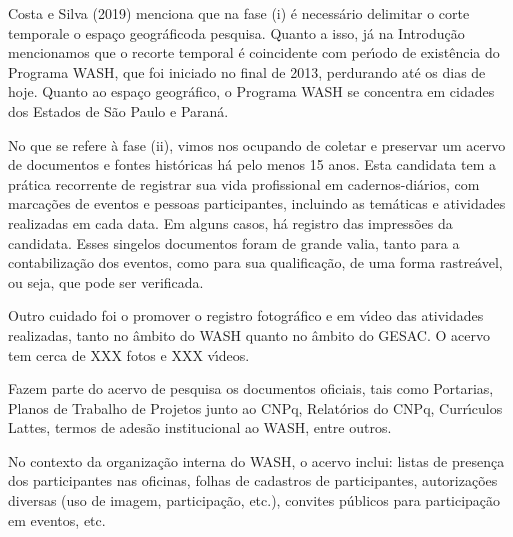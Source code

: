 \documentclass[
12pt,		%
openright,	%
twoside,  %
a4paper,			%
chapter=TITLE,		%
english,			%
french,				%
spanish,			%
brazil				%
]{USPSC-classe/USPSC}
\begin{document}
Costa e Silva (2019) menciona que na fase (i) \'e necess\'ario delimitar o \textquotedbl corte temporal\textquotedbl  e o \textquotedbl espa\c{c}o geogr\'afico\textquotedbl  da pesquisa.  Quanto a isso, j\'a na Introdu\c{c}\~ao mencionamos que o recorte temporal \'e coincidente com per\'{\i}odo de exist\^encia do Programa WASH, que foi iniciado no final de 2013, perdurando at\'e os dias de hoje. Quanto ao espa\c{c}o geogr\'afico, o Programa WASH se concentra em cidades dos Estados de S\~ao Paulo e Paran\'a.









No que se refere \`a fase (ii), vimos nos ocupando de coletar e preservar um acervo de documentos e fontes hist\'oricas h\'a pelo menos 15 anos. Esta candidata tem a pr\'atica recorrente de registrar sua vida profissional em cadernos-di\'arios, com marca\c{c}\~oes de eventos e pessoas participantes, incluindo as tem\'aticas e atividades realizadas em cada data. Em alguns casos, h\'a registro das impress\~oes da candidata. Esses singelos documentos foram de grande valia, tanto para a contabiliza\c{c}\~ao dos eventos, como para sua qualifica\c{c}\~ao, de uma forma rastre\'avel, ou seja, que pode ser verificada.









Outro cuidado foi o promover o registro fotogr\'afico e em v\'{\i}deo das atividades realizadas, tanto no \^ambito do WASH quanto no \^ambito do GESAC. O acervo tem cerca de XXX fotos e XXX v\'{\i}deos.









Fazem parte do acervo de pesquisa os documentos oficiais, tais como Portarias, Planos de Trabalho de Projetos junto ao CNPq, Relat\'orios do CNPq, Curr\'{\i}culos Lattes, termos de ades\~ao institucional ao WASH, entre outros.









No contexto da organiza\c{c}\~ao interna do WASH, o acervo inclui: listas de presen\c{c}a dos participantes nas oficinas, folhas de cadastros de participantes, autoriza\c{c}\~oes diversas (uso de imagem, participa\c{c}\~ao, etc.), convites p\'ublicos  para participa\c{c}\~ao em eventos, etc.
\end{document}
